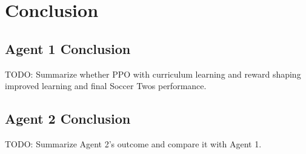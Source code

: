 \documentclass{article}
\begin{document}
	

\section{Conclusion}
\label{sec:conclusion}

\subsection{Agent 1 Conclusion}

TODO: Summarize whether PPO with curriculum learning and reward shaping improved learning and final Soccer Twos performance.

\subsection{Agent 2 Conclusion}

TODO: Summarize Agent 2's outcome and compare it with Agent 1.

	

\clearpage


\end{document}

